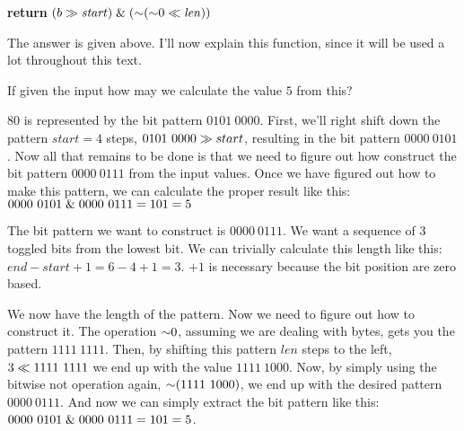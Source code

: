 \begin{Answer}[ref={getbits}]

  \begin{algorithmic}[1]
    \State \textbf{return} $(b \gg \mathit{start}) \mathrel{\&} (\mathord{\sim}
    (\mathord{\sim} 0 \ll \mathit{len}))$
    \EndProcedure
  \end{algorithmic}

  The answer is given above. I'll now explain this function, since it
  will be used a lot throughout this text.

  If given the input  how may we calculate
  the value $5$ from this?

  $80$ is represented by the bit pattern $0101\ 0000$. First, we'll
  right shift down the pattern $start=4$ steps, $0101\ 0000 \gg
  start$, resulting in the bit pattern $0000\ 0101$. Now all that
  remains to be done is that we need to figure out how construct the
  bit pattern $0000\ 0111$ from the input values. Once we have figured
  out how to make this pattern, we can calculate the proper result
  like this: $0000\ 0101 \mathrel{\&} 0000\ 0111 = 101 = 5$

  The bit pattern we want to construct is $0000\ 0111$. We want a
  sequence of $3$ toggled bits from the lowest bit. We can trivially
  calculate this length like this: $end - start + 1 = 6 - 4 + 1 = 3$.
  $ + 1$ is necessary because the bit position are zero based.

  We now have the length of the pattern. Now we need to figure out how
  to construct it. The operation $\mathord{\sim} 0$, assuming we are dealing
  with bytes, gets you the pattern $1111\ 1111$. Then, by shifting
  this pattern $len$ steps to the left, $3 \ShiftLeft 1111\ 1111$ we
  end up with the value $1111\ 1000$. Now, by simply using the bitwise
  not operation again, $\mathord{\sim} (1111\ 1000)$, we end up with the
  desired pattern $0000\ 0111$. And now we can simply extract the bit
  pattern like this: $0000\ 0101 \mathrel{\&} 0000\ 0111 = 101 = 5$.

\end{Answer}
